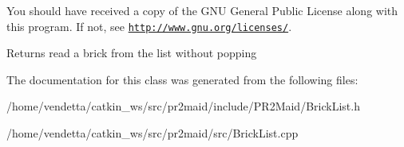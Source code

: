 You should have received a copy of the G\+NU General Public License along with this program. If not, see \href{http://www.gnu.org/licenses/}{\tt http\+://www.\+gnu.\+org/licenses/}. \begin{DoxyReturn}{Returns}
read a brick from the list without popping 
\end{DoxyReturn}


The documentation for this class was generated from the following files\+:\begin{DoxyCompactItemize}
\item 
/home/vendetta/catkin\+\_\+ws/src/pr2maid/include/\+P\+R2\+Maid/Brick\+List.\+h\item 
/home/vendetta/catkin\+\_\+ws/src/pr2maid/src/Brick\+List.\+cpp\end{DoxyCompactItemize}
